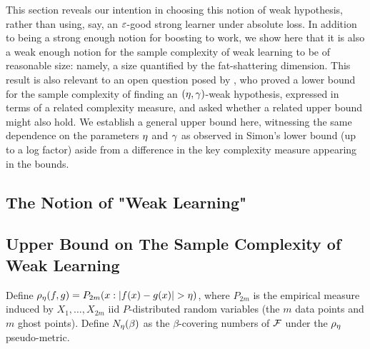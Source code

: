 This section reveals our intention in choosing this notion of weak hypothesis, 
rather than using, say, an $\varepsilon$-good strong learner under absolute loss.
In addition to being a strong enough notion for boosting to work, 
we show here that it is also a weak enough notion for the sample complexity 
of weak learning to be of reasonable size: namely, a size quantified by the fat-shattering dimension.
This result is also relevant to an open question posed by
\citet{DBLP:journals/siamcomp/Simon97}, 
who proved a lower bound for the sample complexity of finding an $(\eta,\gamma)$-weak hypothesis, 
expressed in terms of a related complexity measure, 
and asked whether a related upper bound might also hold.  
We establish a general upper bound here, witnessing the same dependence on the parameters $\eta$ and $\gamma$
as observed in Simon's lower bound (up to a log factor) aside from a difference in the key complexity measure 
appearing in the bounds.

    


\subsection{The Notion of "Weak Learning"}

\blindmathpaper

    



\subsection{Upper Bound on The Sample Complexity of Weak Learning}

Define $\rho_{\eta}(f,g) = P_{2m}( x : |f(x) - g(x)| > \eta )$, where $P_{2m}$ is the empirical measure induced by $X_{1},\ldots,X_{2m}$ iid $P$-distributed random variables
(the $m$ data points and $m$ ghost points).
Define $N_{\eta}(\beta)$ as the $\beta$-covering numbers of $\mathcal{F}$
under the $\rho_{\eta}$ pseudo-metric.

